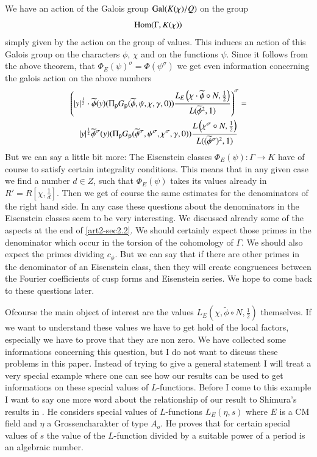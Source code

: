 We have an action of the Galois group $\operatorname{Gal} (K(\chi)/Q)$ on the group
$$
\operatorname{Hom} (\Gamma,K(\chi))
$$
simply given by the action on the group of values. This induces an action of this Galois group on the characters $\phi$, $\chi$ and on the functions $\psi$. Since it follows from the above theorem, that $\Phi_{E}(\psi)^{\sigma}=\Phi(\psi^{\sigma})$ we get even information concerning the galois action on the above numbers
\begin{gather*}
\left(|y|^{\frac{1}{2}}\cdot \widetilde{\phi}(y)(\Pi_{\mathsf{p}}G_{\mathsf{p}}(\widetilde{\phi},\psi,\chi,\gamma,0))\frac{L_{E}\left(\chi\cdot \widetilde{\phi}\circ N,\frac{1}{2}\right)}{L(\widetilde{\phi}^{2},1)}\right)^{\sigma}=\\
|y|^{\frac{1}{2}}\widetilde{\phi}^{\sigma}(y)(\Pi_{\mathsf{p}}G_{\mathsf{p}}(\widetilde{\phi}^{\sigma},\psi^{\sigma},\chi^{\sigma},\gamma,0))\frac{L\left(\chi^{\sigma}\circ N,\frac{1}{2}\right)}{L((\widetilde{\phi}^{\sigma})^{2},1)}
\end{gather*}
But we can say a little bit more: The Eisenstein classes $\Phi_{E}(\psi):\Gamma\to K$ have of course to satisfy certain integrality conditions. This means that in any given case we find a number $d\in Z$, such that $\Phi_{E}(\psi)$ takes its values already in $R'=R\left[\chi,\frac{1}{d}\right]$. Then we get of course the same estimates for the denominators of the right hand side. In any case these questions about the denominators in the Eisenstein classes seem to be very interesting. We discussed already some of the aspects at the end of \ref{art2-sec2.2}. We should certainly expect those primes in the denominator which occur in the torsion of the cohomology of $\Gamma$. We should also expect the primes dividing $c_{\phi}$. But we can say that if there are other primes in the denominator of an Eisenstein class, then they will create congruences between the Fourier coefficients of cusp forms and Eisenstein series. We hope to come back to these questions later.

Of\pageoriginale course the main object of interest are the values $L_{E}(\chi,\widetilde{\phi}\circ N,\frac{1}{2})$ themselves. If we want to understand these values we have to get hold of the local factors, especially we have to prove that they are non zero. We have collected some informations concerning this question, but I do not want to discuss these problems in this paper. Instead of trying to give a general statement I will treat a very special example where one can see how our results can be used to get informations on these special values of $L$-functions. Before I come to this example I want to say one more word about the relationship of our result to Shimura's results in \cite{art2-key24}. He considers special values of $L$-functions $L_{E}(\eta,s)$ where $E$ is a CM field and $\eta$ a Grossencharakter of type $A_{o}$. He proves that for certain special values of $s$ the value of the $L$-function divided by a suitable power of a period is an algebraic number.


